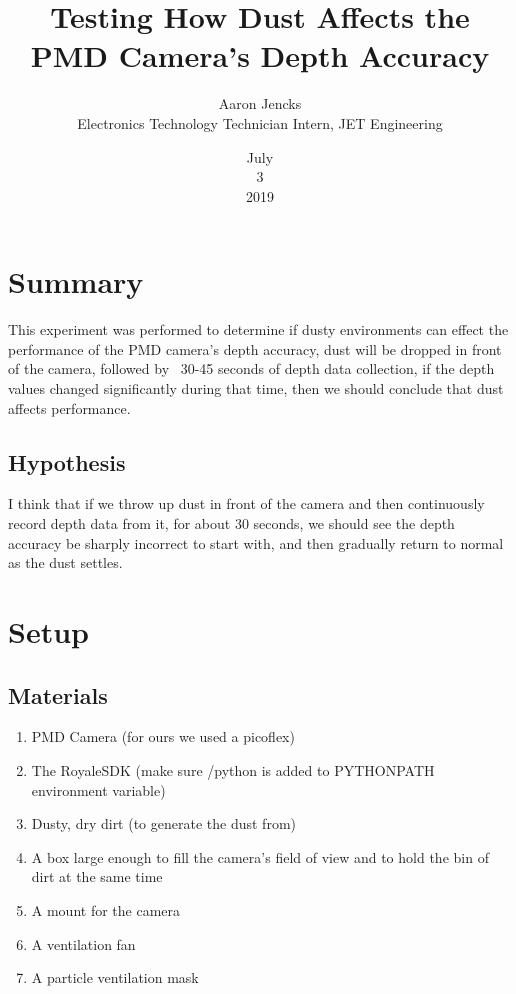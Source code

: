 \documentclass{article}
\title{Testing How Dust Affects the PMD Camera's Depth Accuracy}
\date{July\\3\\2019}
\author{Aaron Jencks\\Electronics Technology Technician Intern, JET Engineering}
\begin{document}
	\maketitle
	\newpage
	
	\tableofcontents
	
	\newpage
	
	\section{Summary}
		This experiment was performed to determine if dusty environments can effect the performance of the PMD camera's depth accuracy, dust will be dropped in front of the camera, followed by ~30-45 seconds of depth data collection, if the depth values changed significantly during that time, then we should conclude that dust affects performance.
		
		\subsection{Hypothesis}
			I think that if we throw up dust in front of the camera and then continuously record depth data from it, for about 30 seconds, we should see the depth accuracy be sharply incorrect to start with, and then gradually return to normal as the dust settles.
		
	\section{Setup}
		\subsection{Materials}
			\begin{enumerate}
				\item PMD Camera (for ours we used a picoflex)
				\item The RoyaleSDK (make sure /python is added to PYTHONPATH environment variable)
				\item Dusty, dry dirt (to generate the dust from)
				\item A box large enough to fill the camera's field of view and to hold the bin of dirt at the same time
				\item A mount for the camera
				\item A ventilation fan
				\item A particle ventilation mask
			\end{enumerate}
		
		\newpage
		
\end{document}
